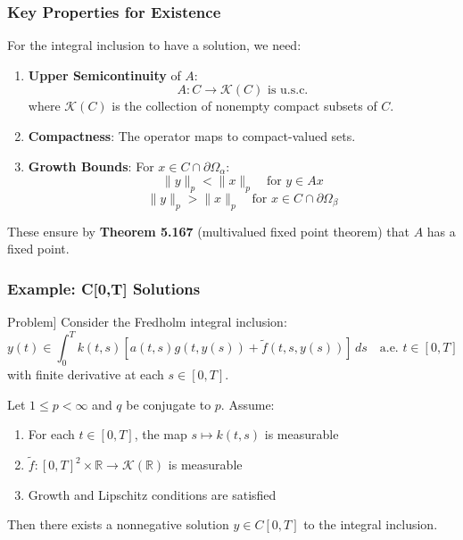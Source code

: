 \documentclass[aspectratio=169,10pt]{beamer}
\begin{document}
\begin{frame}
\frametitle{Key Properties for Existence}

For the integral inclusion to have a solution, we need:

\vspace{0.3cm}

\begin{enumerate}
    \item \textbf{Upper Semicontinuity} of $A$:
    \[
    A: C \to \mathcal{K}(C) \text{ is u.s.c.}
    \]
    where $\mathcal{K}(C)$ is the collection of nonempty compact subsets of $C$.

    \vspace{0.3cm}

    \item \textbf{Compactness}: The operator maps to compact-valued sets.

    \vspace{0.3cm}

    \item \textbf{Growth Bounds}: For $x \in C \cap \partial\Omega_\alpha$:
    \[
    \|y\|_p < \|x\|_p \quad \text{for } y \in Ax
    \]
    \[
    \|y\|_p > \|x\|_p \quad \text{for } x \in C \cap \partial\Omega_\beta
    \]
\end{enumerate}

\vspace{0.5cm}

These ensure by \textbf{Theorem 5.167} (multivalued fixed point theorem) that $A$ has a fixed point.

\end{frame}

\begin{frame}
\frametitle{Example: C[0,T] Solutions}

\begin{definition}[C[0,T] Problem]
Consider the Fredholm integral inclusion:
\[
y(t) \in \int_0^T k(t,s)[a(t,s)g(t, y(s)) + \tilde{f}(t, s, y(s))] \, ds \quad \text{a.e. } t \in [0,T]
\]
with finite derivative at each $s \in [0,T]$.
\end{definition}

\vspace{0.5cm}

\begin{theorem}[Theorem 10.2]
Let $1 \leq p < \infty$ and $q$ be conjugate to $p$. Assume:
\begin{enumerate}
    \item For each $t \in [0,T]$, the map $s \mapsto k(t,s)$ is measurable
    \item $\tilde{f}: [0,T]^2 \times \mathbb{R} \to \mathcal{K}(\mathbb{R})$ is measurable
    \item Growth and Lipschitz conditions are satisfied
\end{enumerate}

Then there exists a nonnegative solution $y \in C[0,T]$ to the integral inclusion.
\end{theorem}

\end{frame}
\end{document}
